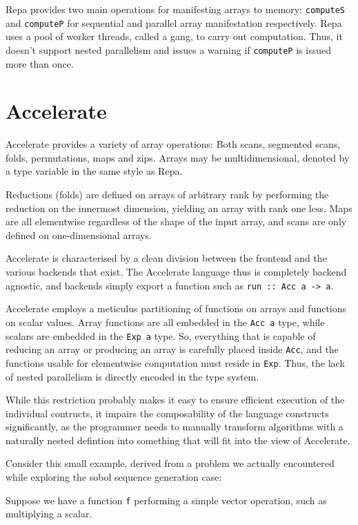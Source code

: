Repa provides two main operations for manifesting arrays to memory:
\texttt{computeS} and \texttt{computeP} for sequential and parallel array
manifestation respectively. Repa uses a pool of worker threads, called a gang,
to carry out computation. Thus, it doesn't support nested parallelism and issues
a warning if \texttt{computeP} is issued more than once.

\section{Accelerate}

Accelerate provides a variety of array operations: Both scans, segmented scans,
folds, permutations, maps and zips. Arrays may be multidimensional, denoted by
a type variable in the same style as Repa.

Reductions (folds) are defined on arrays of arbitrary rank by performing the
reduction on the innermost dimension, yielding an array with rank one less.
Maps are all elementwise regardless of the shape of the input array, and scans
are only defined on one-dimensional arrays.

Accelerate is characterised by a clean division between the frontend and the
various backends that exist. The Accelerate language thus is completely backend
agnostic, and backends simply export a function such as \hbox{\texttt{run :: Acc a ->
a}.}

Accelerate employs a meticulus partitioning of functions on arrays and functions
on scalar values. Array functions are all embedded in the \texttt{Acc a} type,
while scalars are embedded in the \texttt{Exp a} type. So, everything that is
capable of reducing an array or producing an array is carefully placed inside
\texttt{Acc}, and the functions usable for elementwise computation must
reside in \texttt{Exp}. Thus, the lack of nested parallelism is directly
encoded in the type system.

While this restriction probably makes it easy to ensure efficient execution of
the individual contructs, it impairs the composability of the language
constructs significantly, as the programmer needs to manually transform
algorithms with a naturally nested defintion into something that will fit into
the view of Accelerate.

Consider this small example, derived from a problem we actually encountered
while exploring the sobol sequence generation case:

Suppose we have a function \texttt{f} performing a simple vector operation,
such as multiplying a scalar.

